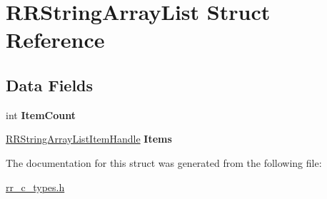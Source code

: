 \hypertarget{struct_r_r_string_array_list}{
\section{\-R\-R\-String\-Array\-List \-Struct \-Reference}
\label{struct_r_r_string_array_list}
}
\subsection*{\-Data \-Fields}
\begin{DoxyCompactItemize}
\item 
\hypertarget{struct_r_r_string_array_list_ab970c710c7f3897df3c63f76dc5a0793}{
int {\bfseries \-Item\-Count}}
\label{struct_r_r_string_array_list_ab970c710c7f3897df3c63f76dc5a0793}

\item 
\hypertarget{struct_r_r_string_array_list_a0ef0ac4d72f04a061dc23decb55cb2ae}{
\hyperlink{struct_r_r_string_array_list_item}{\-R\-R\-String\-Array\-List\-Item\-Handle} {\bfseries \-Items}}
\label{struct_r_r_string_array_list_a0ef0ac4d72f04a061dc23decb55cb2ae}

\end{DoxyCompactItemize}


\-The documentation for this struct was generated from the following file\-:\begin{DoxyCompactItemize}
\item 
\hyperlink{rr__c__types_8h}{rr\-\_\-c\-\_\-types.\-h}\end{DoxyCompactItemize}
